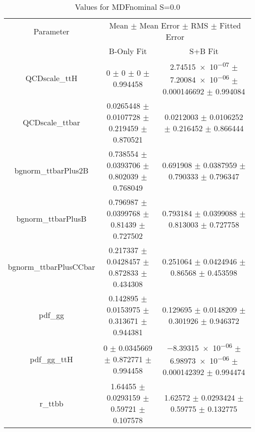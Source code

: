 \begin{table}
\centering
\caption{Values for MDFnominal S=0.0}
\begin{tabular}{ccc}
\toprule
Parameter & \multicolumn{2}{c}{Mean $\pm$ Mean Error $\pm$ RMS $\pm$ Fitted Error}\\
 & B-Only Fit & S+B Fit\\
\midrule
QCDscale\_ttH & \num{0} $\pm$ \num{0} $\pm$ \num{0} $\pm$ \num{0.994458} & \num{2.74515e-07} $\pm$ \num{7.20084e-06} $\pm$ \num{0.000146692} $\pm$ \num{0.994084}\\
QCDscale\_ttbar & \num{0.0265448} $\pm$ \num{0.0107728} $\pm$ \num{0.219459} $\pm$ \num{0.870521} & \num{0.0212003} $\pm$ \num{0.0106252} $\pm$ \num{0.216452} $\pm$ \num{0.866444}\\
bgnorm\_ttbarPlus2B & \num{0.738554} $\pm$ \num{0.0393706} $\pm$ \num{0.802039} $\pm$ \num{0.768049} & \num{0.691908} $\pm$ \num{0.0387959} $\pm$ \num{0.790333} $\pm$ \num{0.796347}\\
bgnorm\_ttbarPlusB & \num{0.796987} $\pm$ \num{0.0399768} $\pm$ \num{0.81439} $\pm$ \num{0.727502} & \num{0.793184} $\pm$ \num{0.0399088} $\pm$ \num{0.813003} $\pm$ \num{0.727758}\\
bgnorm\_ttbarPlusCCbar & \num{0.217337} $\pm$ \num{0.0428457} $\pm$ \num{0.872833} $\pm$ \num{0.434308} & \num{0.251064} $\pm$ \num{0.0424946} $\pm$ \num{0.86568} $\pm$ \num{0.453598}\\
pdf\_gg & \num{0.142895} $\pm$ \num{0.0153975} $\pm$ \num{0.313671} $\pm$ \num{0.944381} & \num{0.129695} $\pm$ \num{0.0148209} $\pm$ \num{0.301926} $\pm$ \num{0.946372}\\
pdf\_gg\_ttH & \num{0} $\pm$ \num{0.0345669} $\pm$ \num{0.872771} $\pm$ \num{0.994458} & \num{-8.39315e-06} $\pm$ \num{6.98973e-06} $\pm$ \num{0.000142392} $\pm$ \num{0.994474}\\
r\_ttbb & \num{1.64455} $\pm$ \num{0.0293159} $\pm$ \num{0.59721} $\pm$ \num{0.107578} & \num{1.62572} $\pm$ \num{0.0293424} $\pm$ \num{0.59775} $\pm$ \num{0.132775}\\
\bottomrule
\end{tabular}
\end{table}